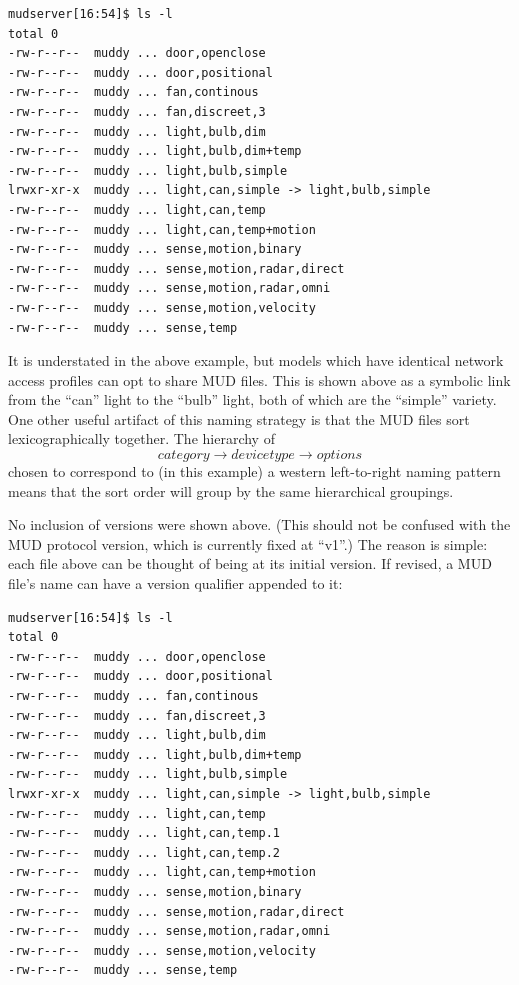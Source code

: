 \documentclass[conference]{IEEEtran}
\begin{document}
{{\ttfamily\scriptsize
\begin{verbatim}
mudserver[16:54]$ ls -l
total 0
-rw-r--r--  muddy ... door,openclose
-rw-r--r--  muddy ... door,positional
-rw-r--r--  muddy ... fan,continous
-rw-r--r--  muddy ... fan,discreet,3
-rw-r--r--  muddy ... light,bulb,dim
-rw-r--r--  muddy ... light,bulb,dim+temp
-rw-r--r--  muddy ... light,bulb,simple
lrwxr-xr-x  muddy ... light,can,simple -> light,bulb,simple
-rw-r--r--  muddy ... light,can,temp
-rw-r--r--  muddy ... light,can,temp+motion
-rw-r--r--  muddy ... sense,motion,binary
-rw-r--r--  muddy ... sense,motion,radar,direct
-rw-r--r--  muddy ... sense,motion,radar,omni
-rw-r--r--  muddy ... sense,motion,velocity
-rw-r--r--  muddy ... sense,temp
\end{verbatim}
}

It is understated in the above example, but models which have
identical network access profiles can opt to share MUD files.  This is
shown above as a symbolic link from the ``can'' light to the ``bulb''
light, both of which are the ``simple'' variety.  One other useful
artifact of this naming strategy is that the MUD files sort
lexicographically together.  The hierarchy of
\begin{equation}
  category \rightarrow device type \rightarrow options
\end{equation}
chosen to correspond to (in this example) a western left-to-right
naming pattern means that the sort order will group by the same
hierarchical groupings.

No inclusion of versions were shown above.  (This should not be
confused with the MUD protocol version, which is currently fixed at
``v1''.)  The reason is simple: each file above can be thought of
being at its initial version.  If revised, a MUD file's name can have
a version qualifier appended to it:

{\ttfamily\scriptsize
\begin{verbatim}
mudserver[16:54]$ ls -l
total 0
-rw-r--r--  muddy ... door,openclose
-rw-r--r--  muddy ... door,positional
-rw-r--r--  muddy ... fan,continous
-rw-r--r--  muddy ... fan,discreet,3
-rw-r--r--  muddy ... light,bulb,dim
-rw-r--r--  muddy ... light,bulb,dim+temp
-rw-r--r--  muddy ... light,bulb,simple
lrwxr-xr-x  muddy ... light,can,simple -> light,bulb,simple
-rw-r--r--  muddy ... light,can,temp
-rw-r--r--  muddy ... light,can,temp.1
-rw-r--r--  muddy ... light,can,temp.2
-rw-r--r--  muddy ... light,can,temp+motion
-rw-r--r--  muddy ... sense,motion,binary
-rw-r--r--  muddy ... sense,motion,radar,direct
-rw-r--r--  muddy ... sense,motion,radar,omni
-rw-r--r--  muddy ... sense,motion,velocity
-rw-r--r--  muddy ... sense,temp
\end{verbatim}
}

}
\end{document}
